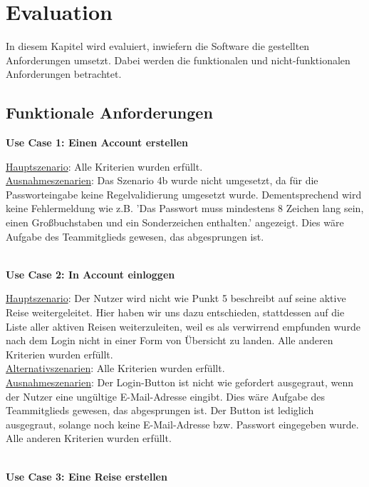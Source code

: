 \section{Evaluation}
In diesem Kapitel wird evaluiert, inwiefern die Software die gestellten Anforderungen umsetzt. Dabei werden die funktionalen und nicht-funktionalen Anforderungen betrachtet.

\subsection{Funktionale Anforderungen}

\textbf{Use Case 1: Einen Account erstellen}\\
\begin{addmargin}{10pt}
\underline{Hauptszenario}: Alle Kriterien wurden erfüllt.\\
\underline{Ausnahmeszenarien}: Das Szenario 4b wurde nicht umgesetzt, da für die Passworteingabe keine Regelvalidierung umgesetzt wurde. Dementsprechend wird keine Fehlermeldung wie z.B. 'Das Passwort muss mindestens 8 Zeichen lang sein, einen Großbuchstaben und ein Sonderzeichen enthalten.' angezeigt. Dies wäre Aufgabe des Teammitglieds gewesen, das abgesprungen ist.\\
\end{addmargin}
\\
\textbf{Use Case 2: In Account einloggen}\\

\begin{addmargin}{10pt}
\underline{Hauptszenario}: Der Nutzer wird nicht wie Punkt 5 beschreibt auf seine aktive Reise weitergeleitet. Hier haben wir uns dazu entschieden, stattdessen auf die Liste aller aktiven Reisen weiterzuleiten, weil es als verwirrend empfunden wurde nach dem Login nicht in einer Form von Übersicht zu landen. Alle anderen Kriterien wurden erfüllt.\\
\underline{Alternativszenarien}: Alle Kriterien wurden erfüllt.\\
\underline{Ausnahmeszenarien}: Der Login-Button ist nicht wie gefordert ausgegraut, wenn der Nutzer eine ungültige E-Mail-Adresse eingibt. Dies wäre Aufgabe des Teammitglieds gewesen, das abgesprungen ist. Der Button ist lediglich ausgegraut, solange noch keine E-Mail-Adresse bzw. Passwort eingegeben wurde. Alle anderen Kriterien wurden erfüllt.\\
\end{addmargin}
\\
\textbf{Use Case 3: Eine Reise erstellen}\\

